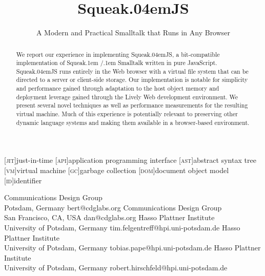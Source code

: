 \documentclass[natbib]{sigplanconf}
\newcommand*\SqueakJS{Squeak\texorpdfstring{\kern.04em}{}JS\xspace}
\newcommand*\SqueakST{Squeak\kern.1em /\kern.1em\penalty0 Smalltalk\xspace}
\newcommand*\JS{JavaScript\xspace}
\newcommand*\SqueakJSTitle{\SqueakJS}
\newcommand*\SqueakJSSubtitle{A Modern and Practical Smalltalk that Runs in Any Browser}
\begin{document}
\exclusivelicense
{}

[\textsc{jit}]{just-in-time}
[\textsc{api}]{application programming interface}
[\textsc{ast}]{abstract syntax tree}
[\textsc{vm}]{virtual machine}
[\textsc{gc}]{garbage collection}
[\textsc{dom}]{document object model}
[\textsc{id}]{identifier}
\title{\SqueakJSTitle}
\subtitle{\SqueakJSSubtitle}

           {Communications Design Group\\Potsdam, Germany}
           {bert@cdglabs.org}
           {Communications Design Group\\San Francisco, CA, USA}
           {dan@cdglabs.org}
           {Hasso Plattner Institute\\University of Potsdam, Germany}
           {tim.felgentreff@hpi.uni-potsdam.de}
           {Hasso Plattner Institute\\University of Potsdam, Germany}
           {tobias.pape@hpi.uni-potsdam.de}
           {Hasso Plattner Institute\\University of Potsdam, Germany}
           {robert.hirschfeld@hpi.uni-potsdam.de}

\maketitle

\begin{abstract}
  We report our experience in implementing \SqueakJS, a bit-compatible
  implementation of \SqueakST written in pure \JS. \SqueakJS runs
  entirely in the Web browser with a virtual file system that can be
  directed to a server or client-side storage. Our implementation is
  notable for simplicity and performance gained through adaptation to
  the host object memory and deployment leverage gained through the
  Lively Web development environment. We present several novel
  techniques as well as performance measurements for the resulting
  virtual machine. Much of this experience is potentially relevant to
  preserving other dynamic language systems and making them available
  in a browser-based environment.
\end{abstract}
\end{document}
